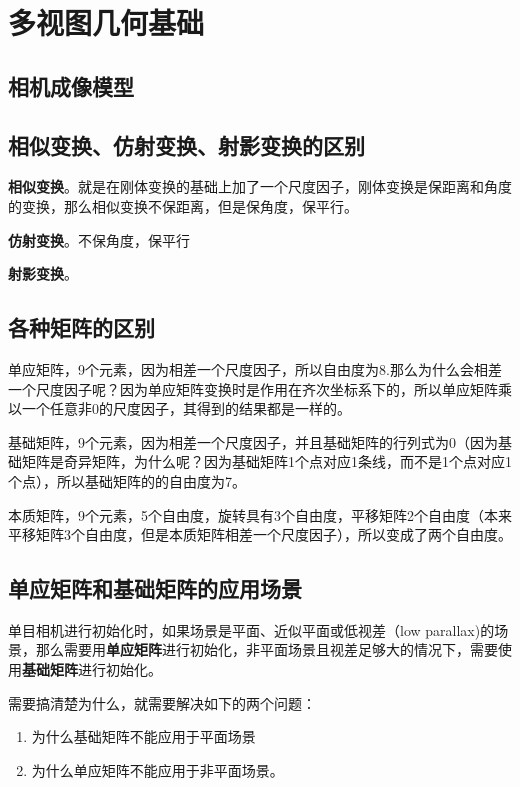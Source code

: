 
\chapter{多视图几何基础}
\section{相机成像模型}


\section{相似变换、仿射变换、射影变换的区别}
\textbf{相似变换}。就是在刚体变换的基础上加了一个尺度因子，刚体变换是保距离和角度的变换，那么相似变换不保距离，但是保角度，保平行。

\textbf{仿射变换}。不保角度，保平行

\textbf{射影变换}。






\section{各种矩阵的区别}


单应矩阵，9个元素，因为相差一个尺度因子，所以自由度为8.那么为什么会相差一个尺度因子呢？因为单应矩阵变换时是作用在齐次坐标系下的，所以单应矩阵乘以一个任意非0的尺度因子，其得到的结果都是一样的。

基础矩阵，9个元素，因为相差一个尺度因子，并且基础矩阵的行列式为0（因为基础矩阵是奇异矩阵，为什么呢？因为基础矩阵1个点对应1条线，而不是1个点对应1个点），所以基础矩阵的的自由度为7。

本质矩阵，9个元素，5个自由度，旋转具有3个自由度，平移矩阵2个自由度（本来平移矩阵3个自由度，但是本质矩阵相差一个尺度因子），所以变成了两个自由度。


\section{单应矩阵和基础矩阵的应用场景}

单目相机进行初始化时，如果场景是平面、近似平面或低视差（low parallax)的场景，那么需要用\textbf{单应矩阵}进行初始化，非平面场景且视差足够大的情况下，需要使用\textbf{基础矩阵}进行初始化。

需要搞清楚为什么，就需要解决如下的两个问题：
\begin{enumerate}
	\item 为什么基础矩阵不能应用于平面场景
	\item 为什么单应矩阵不能应用于非平面场景。
\end{enumerate}


